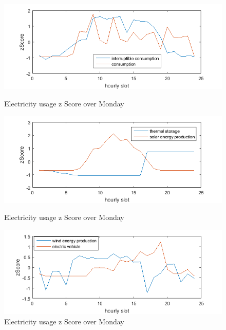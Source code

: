\begin{figure}
\centering
\includegraphics[scale=0.9]{daily1.png}
\caption{Electricity usage z Score over Monday}
\label{fig:daily1}
\includegraphics[scale=0.9]{daily2.png}
\caption{Electricity usage z Score over Monday}
\label{fig:daily2}
\includegraphics[scale=0.9]{daily3.png}
\caption{Electricity usage z Score over Monday}
\label{fig:daily3}
\end{figure}

